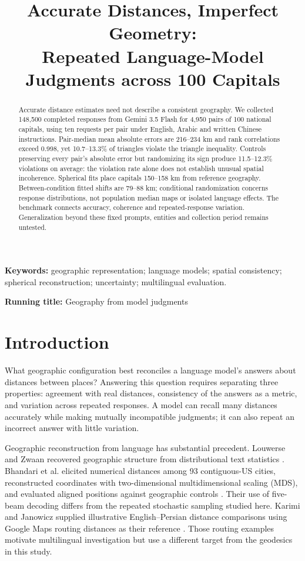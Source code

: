 \documentclass[12pt,a4paper]{article}
\title{Accurate Distances, Imperfect Geometry:\\Repeated Language-Model Judgments across 100 Capitals}
\author{}
\date{}
\begin{document}
\maketitle
\begin{abstract}
Accurate distance estimates need not describe a consistent geography. We collected 148,500 completed responses from Gemini 3.5 Flash for 4,950 pairs of 100 national capitals, using ten requests per pair under English, Arabic and written Chinese instructions. Pair-median mean absolute errors are 216--234 km and rank correlations exceed 0.998, yet 10.7--13.3\% of triangles violate the triangle inequality. Controls preserving every pair's absolute error but randomizing its sign produce 11.5--12.3\% violations on average: the violation rate alone does not establish unusual spatial incoherence. Spherical fits place capitals 150--158 km from reference geography. Between-condition fitted shifts are 79--88 km; conditional randomization concerns response distributions, not population median maps or isolated language effects. The benchmark connects accuracy, coherence and repeated-response variation. Generalization beyond these fixed prompts, entities and collection period remains untested.
\end{abstract}

\noindent\textbf{Keywords:} geographic representation; language models; spatial consistency; spherical reconstruction; uncertainty; multilingual evaluation.
\par\noindent\textbf{Running title:} Geography from model judgments

\section{Introduction}
What geographic configuration best reconciles a language model's answers about distances between places? Answering this question requires separating three properties: agreement with real distances, consistency of the answers as a metric, and variation across repeated responses. A model can recall many distances accurately while making mutually incompatible judgments; it can also repeat an incorrect answer with little variation.

Geographic reconstruction from language has substantial precedent. Louwerse and Zwaan recovered geographic structure from distributional text statistics \cite{louwerse}. Bhandari et al. elicited numerical distances among 93 contiguous-US cities, reconstructed coordinates with two-dimensional multidimensional scaling (MDS), and evaluated aligned positions against geographic controls \cite{bhandari}. Their use of five-beam decoding differs from the repeated stochastic sampling studied here. Karimi and Janowicz supplied illustrative English--Persian distance comparisons using Google Maps routing distances as their reference \cite{karimi}. Those routing examples motivate multilingual investigation but use a different target from the geodesics in this study.
\end{document}
